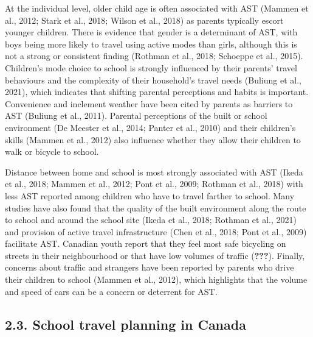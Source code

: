 \documentclass[]{elsarticle} %
\begin{document}
At the individual level, older child age is often associated with AST
(Mammen et al., 2012; Stark et al., 2018; Wilson et al., 2018) as
parents typically escort younger children. There is evidence that gender
is a determinant of AST, with boys being more likely to travel using
active modes than girls, although this is not a strong or consistent
finding (Rothman et al., 2018; Schoeppe et al., 2015). Children's mode
choice to school is strongly influenced by their parents' travel
behaviours and the complexity of their household's travel needs (Buliung
et al., 2021), which indicates that shifting parental perceptions and
habits is important. Convenience and inclement weather have been cited
by parents as barriers to AST (Buliung et al., 2011). Parental
perceptions of the built or school environment (De Meester et al., 2014;
Panter et al., 2010) and their children's skills (Mammen et al., 2012)
also influence whether they allow their children to walk or bicycle to
school.

Distance between home and school is most strongly associated with AST
(Ikeda et al., 2018; Mammen et al., 2012; Pont et al., 2009; Rothman et
al., 2018) with less AST reported among children who have to travel
farther to school. Many studies have also found that the quality of the
built environment along the route to school and around the school site
(Ikeda et al., 2018; Rothman et al., 2021) and provision of active
travel infrastructure (Chen et al., 2018; Pont et al., 2009) facilitate
AST. Canadian youth report that they feel most safe bicycling on streets
in their neighbourhood or that have low volumes of traffic
({\textbf{???}}). Finally, concerns about traffic and strangers have
been reported by parents who drive their children to school (Mammen et
al., 2012), which highlights that the volume and speed of cars can be a
concern or deterrent for AST.

\hypertarget{school-travel-planning-in-canada}{%
\subsection{2.3. School travel planning in
Canada}\label{school-travel-planning-in-canada}}
\end{document}
